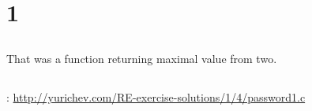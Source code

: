 \section{ 1}

\subsection{}

{That was a function returning maximal value from two}.

\subsection{}

: \url{http://yurichev.com/RE-exercise-solutions/1/4/password1.c}

